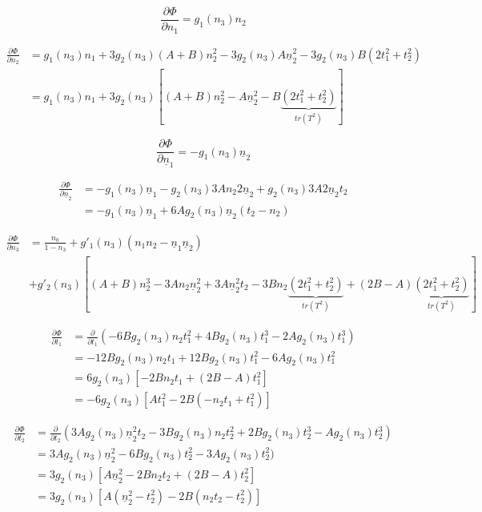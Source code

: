 \documentclass{article}
\begin{document}
\begin{equation}
	\frac{\partial \Phi}{\partial n_1} = g_1 (n_3) n_2
\end{equation}

\begin{align}
	\frac{\partial \Phi}{\partial n_2} &= g_1 (n_3) n_1 + 3 g_2 (n_3) (A+B) n_2^2 - 3 g_2 (n_3) A \underline{n}_2^2 - 3 g_2 (n_3) B (2 t_1^2 + t_2^2) \\
	&= g_1 (n_3) n_1 + 3 g_2 (n_3) \left[ (A+B) n_2^2 - A \underline{n}_2^2 - B \underbrace{(2 t_1^2 + t_2^2)}_{tr(T^2)} \right]
\end{align}

\begin{equation}
	\frac{\partial \Phi}{\partial \underline{n}_1} = -g_1 (n_3) \underline{n}_2
\end{equation}

\begin{align}
	\frac{\partial \Phi}{\partial \underline{n}_2} &= -g_1 (n_3) \underline{n}_1 - g_2 (n_3) 3 A n_2 2 \underline{n}_2 + g_2 (n_3) 3 A 2 \underline{n}_2 t_2 \\
	&= -g_1 (n_3) \underline{n}_1 + 6 A g_2 (n_3) \underline{n}_2 (t_2 - n_2)
\end{align}

\begin{align}
	\frac{\partial \Phi}{\partial n_3} &= \frac{n_0}{1-n_3} + g'_1(n_3) (n_1 n_2 - \underline{n}_1 \underline{n}_2) \\
	& + g'_2(n_3) \left[ (A+B) n_2^3 - 3A n_2 \underline{n}_2^2 +3A \underline{n}_2^2 t_2 - 3B n_2 \underbrace{(2 t_1^2 + t_2^2)}_{tr(T^2)} + (2B-A) \underbrace{(2 t_1^2 + t_2^2)}_{tr(T^2)} \right]
\end{align}

\begin{align}
	\frac{\partial \Phi}{\partial t_1} &= \frac{\partial}{\partial t_1} \left( -6B g_2(n_3) n_2 t_1^2 + 4B g_2(n_3) t_1^3 - 2A g_2(n_3) t_1^3 \right) \\
	&= -12B g_2(n_3) n_2 t_1 + 12B g_2(n_3) t_1^2 - 6A g_2(n_3) t_1^2 \\
	&= 6 g_2(n_3) \left[ -2B n_2 t_1 + (2B-A)t_1^2 \right] \\
	&= -6 g_2(n_3) \left[ A t_1^2 - 2B (-n_2 t_1 + t_1^2) \right] 
\end{align}

\begin{align}
	\frac{\partial \Phi}{\partial t_2} &= \frac{\partial}{\partial t_2} \left( 3A g_2(n_3) \underline{n}_2^2 t_2 - 3B g_2(n_3) n_2 t_2^2 + 2B g_2(n_3) t_2^3 - A g_2(n_3) t_2^3 \right) \\
	&= 3A g_2(n_3) \underline{n}_2^2 - 6B g_2(n_3) t_2^2 - 3A g_2(n_3) t_2^2 ) \\
	&= 3 g_2(n_3) \left[ A \underline{n}_2^2 - 2B n_2 t_2 + (2B-A) t_2^2 \right] \\
	&= 3 g_2(n_3) \left[ A(\underline{n}_2^2 -t_2^2) - 2B(n_2 t_2 - t_2^2) \right]
\end{align}
\end{document}
